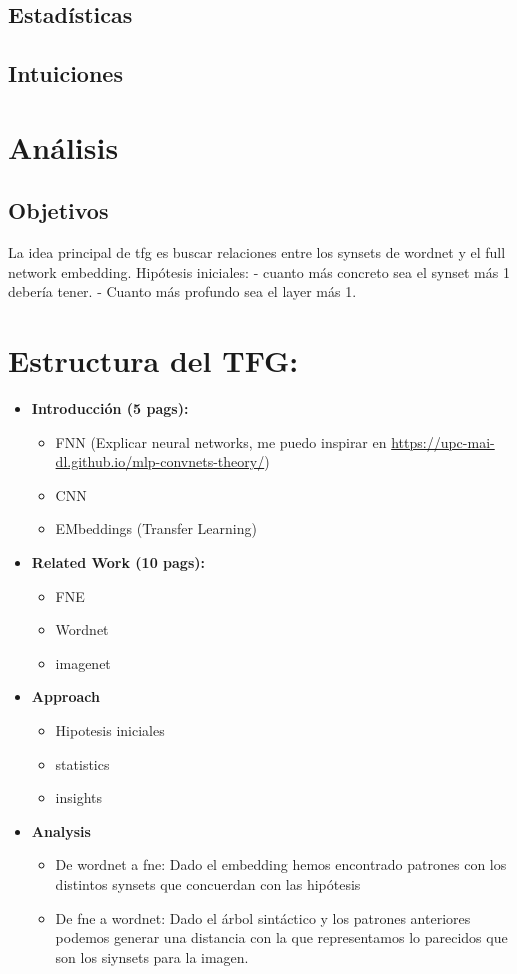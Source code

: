 \documentclass[12,twoside]{TFG-GM}
\theoremstyle{definition}
\theoremstyle{remark}
\begin{document}
\subsection{Estadísticas}

\subsection{Intuiciones}

\newpage
\section{Análisis}
\subsection{Objetivos}
La idea principal de tfg es buscar relaciones entre los synsets de wordnet y el full network embedding. 
Hipótesis iniciales: 
- cuanto más concreto sea el synset más 1 debería tener.
- Cuanto más profundo sea el layer más 1.


\section{Estructura del TFG: }

\begin{itemize}
\item \textbf{Introducción (5 pags): }
\begin{itemize}
\item FNN (Explicar neural networks, me puedo inspirar en \url{https://upc-mai-dl.github.io/mlp-convnets-theory/})
\item CNN 
\item EMbeddings  (Transfer Learning)
\end{itemize}
\item \textbf{Related Work (10 pags):}
\begin{itemize}
\item FNE 
\item Wordnet 
\item imagenet 
\end{itemize}
\item \textbf{Approach }
\begin{itemize}
\item Hipotesis iniciales 
\item statistics 
\item insights 
\end{itemize}
\item \textbf{Analysis}
\begin{itemize}
\item De wordnet a fne: Dado el embedding hemos encontrado patrones con los distintos synsets que concuerdan con las hipótesis
\item De fne a wordnet: Dado el árbol sintáctico y los patrones anteriores podemos generar una distancia con la que representamos lo parecidos que son los siynsets para la imagen. 
\end{itemize}
\end{itemize}
\end{document}

